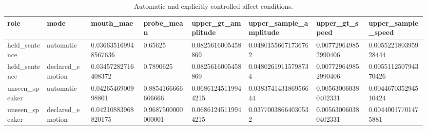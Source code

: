 \begin{table}[t]
\centering
\caption{Automatic and explicitly controlled affect conditions.}
\begin{tabular}{llllllll}
\toprule
role & mode & mouth\_mae & probe\_mean & upper\_gt\_amplitude & upper\_sample\_amplitude & upper\_gt\_speed & upper\_sample\_speed \\
\midrule
held\_sentence & automatic & 0.036635169948567636 & 0.65625 & 0.0825616005458869 & 0.04801556671736762 & 0.007729649852990406 & 0.005522180395928444 \\
held\_sentence & declared\_emotion & 0.03457282716408372 & 0.7890625 & 0.0825616005458869 & 0.04802619115798734 & 0.007729649852990406 & 0.005511250794370426 \\
unseen\_speaker & automatic & 0.0426546900998801 & 0.8854166666666666 & 0.06861245119944215 & 0.038374143186956644 & 0.005630060380402331 & 0.004467035294510424 \\
unseen\_speaker & declared\_emotion & 0.04210883968820175 & 0.9687500000000001 & 0.06861245119944215 & 0.03770038664030532 & 0.005630060380402331 & 0.00440017701475881 \\
\bottomrule
\end{tabular}
\end{table}
